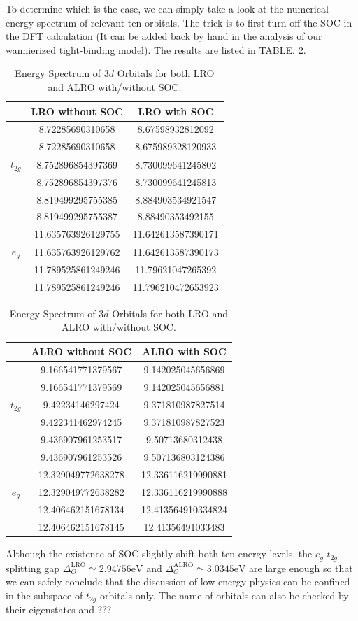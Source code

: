 \documentclass[10pt,nofootinbib,letterpaper]{revtex4}
\begin{document}
		To determine which is the case, we can simply take a look at the numerical energy spectrum of relevant ten orbitals. The trick is to first turn off the SOC in the DFT calculation (It can be added back by hand in the analysis of our wannierized tight-binding model). The results are listed in TABLE. \ref{tab:LRO}.\par
		\begin{table}[!htp]
			\begin{tabular}{|c|c|c|}
				 & LRO without SOC & LRO with SOC\\
				\hline
						&8.72285690310658	& 8.67598932812092\\
	  					&8.72285690310658	& 8.675989328120933\\
				$t_{2g}$&8.752896854397369	& 8.730099641245802\\
						&8.752896854397376	& 8.730099641245813\\
						&8.819499295755385	& 8.884903534921547\\
						&8.819499295755387	& 8.88490353492155\\
						\hline
						&11.635763926129755	& 11.642613587390171\\
				$e_g$	&11.635763926129762	& 11.642613587390173\\
						&11.789525861249246	& 11.79621047265392\\
						&11.789525861249246	& 11.796210472653923
			\end{tabular}
			\hspace{2em}
			\begin{tabular}{|c|c|c|}
				 & ALRO without SOC & ALRO with SOC\\
				\hline
						&9.166541771379567	&9.142025045656869\\
	  					&9.166541771379569	&9.142025045656881\\
				$t_{2g}$&9.42234146297424	&9.371810987827514\\
						&9.422341462974245	&9.371810987827523\\
						&9.436907961253517	&9.50713680312438\\
						&9.436907961253526	&9.507136803124386\\
						\hline
						&12.329049772638278	&12.336116219990881\\
				$e_g$	&12.329049772638282	&12.336116219990888\\
						&12.406462151678134	&12.413564910334824\\
						&12.406462151678145	&12.41356491033483
			\end{tabular}
			\caption{Energy Spectrum of $3d$ Orbitals for both LRO and ALRO with/without SOC.}
			\label{tab:LRO}
		\end{table}
		Although the existence of SOC slightly shift both ten energy levels, the $e_g$-$t_{2g}$ splitting gap $\Delta_O^{\text{LRO}}\simeq2.94756\mathrm{eV}$ and $\Delta_O^{\text{ALRO}}\simeq3.0345\mathrm{eV}$ are large enough so that we can safely conclude that the discussion of low-energy physics can be confined in the subspace of $t_{2g}$ orbitals only. The name of orbitals can also be checked by their eigenstates and ???\par
\end{document}
